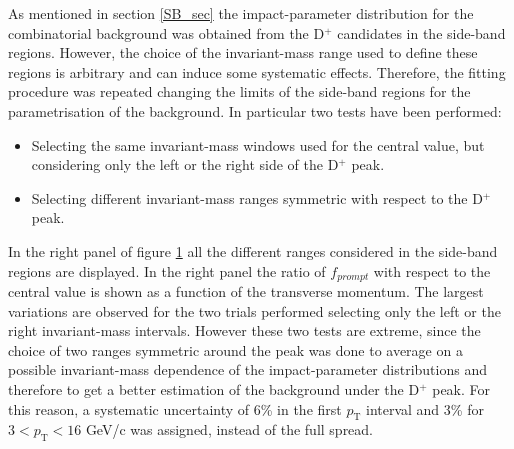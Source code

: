 \documentclass[b5paper,10pt,twoside,oldstyle,classica]{toptesi}
\newcommand{\pt}{p_\text{T}}
\begin{document}
\begin{figure}[tb]
\begin{center}
\label{SBrange_syst}
\end{center}
\end{figure} \hspace{-0.2cm}As mentioned in section \ref{SB_sec} the impact-parameter distribution for the combinatorial background was obtained from the D$^+$ candidates in the side-band regions. However, the choice of the invariant-mass range used to define these regions is arbitrary and can induce some systematic effects. Therefore, the fitting procedure was repeated changing the limits of the side-band regions for the parametrisation of the background. In particular two tests have been performed:
\begin{itemize}
 \item Selecting the same invariant-mass windows used for the central value, but considering only the left or the right side of the D$^+$ peak.
 \item Selecting different invariant-mass ranges symmetric with respect to the D$^+$ peak.
\end{itemize}
In the right panel of figure \ref{SBrange_syst} all the different ranges considered in the side-band regions are displayed. In the right panel the ratio of $f_{prompt}$ with respect to the central value is shown as a function of the transverse momentum. The largest variations are observed for the two trials performed selecting only the left or the right invariant-mass intervals. However these two tests are extreme, since the choice of two ranges symmetric around the peak was done to average on a possible invariant-mass dependence of the impact-parameter distributions and therefore to get a better estimation of the background under the D$^+$ peak. For this reason, a systematic uncertainty of 6\% in the first $\pt$ interval and 3\% for $3<\pt<16$ GeV/c was assigned, instead of the full spread. 
\end{document}
